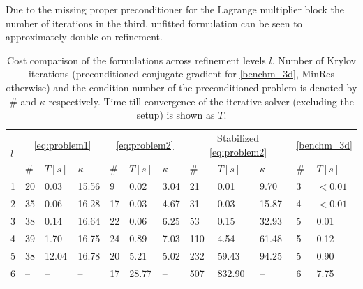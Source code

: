 \documentclass[r]{siamart171218}
\begin{document}
Due to the missing proper preconditioner for the Lagrange multiplier block the
number of iterations in the third, unfitted formulation can be seen to approximately
double on refinement. 

\begin{table}
  \scriptsize{
  \begin{center}
    \begin{tabular}{l|lll|lll|lll|ll}
      \hline
      \multirow{2}{*}{$l$} & \multicolumn{3}{c|}{\eqref{eq:problem1}} & \multicolumn{3}{c|}{\eqref{eq:problem2}} & \multicolumn{3}{c|}{ Stabilized \eqref{eq:problem2}} & \multicolumn{2}{c}{\eqref{benchm_3d}}\\
      \cline{2-12}
      & \# & $T\left[s\right]$ & $\kappa$ & \# & $T\left[s\right]$ & $\kappa$ & \# & $T\left[s\right]$ & $\kappa$ & \# & $T\left[s\right]$\\
      \hline
      1 & 20 & 0.03  & 15.56 & 9  & 0.02  & 3.04 & 21  & 0.01   & 9.70  &3 & $<0.01$\\ 
      2 & 35 & 0.06  & 16.28 & 17 & 0.03  & 4.67 & 31  & 0.03   & 15.87 &4 & $<0.01$\\ 
      3 & 38 & 0.14  & 16.64 & 22 & 0.06  & 6.25 & 53  & 0.15   & 32.93 &5 & 0.01   \\ 
      4 & 39 & 1.70  & 16.75 & 24 & 0.89  & 7.03 & 110 & 4.54   & 61.48 &5 & 0.12   \\ 
      5 & 38 & 12.04 & 16.78 & 20 & 5.21  & 5.02 & 232 & 59.43  & 94.25 &5 & 0.90  \\ 
      6 & -- & --    & --    & 17 & 28.77 & --   & 507 & 832.90 & --    &6 & 7.75  \\
      \hline
    \end{tabular}
    \end{center}
    }
  \caption{Cost comparison of the formulations across refinement levels $l$.
    Number of Krylov  iterations (preconditioned conjugate gradient for \eqref{benchm_3d},
    MinRes otherwise) and the condition number of the preconditioned
    problem is denoted by $\#$ and $\kappa$ respectively. Time till convergence
    of the iterative solver (excluding the setup) is shown as $T$. 
  }
\label{tab:cost}
\end{table}
\end{document}
